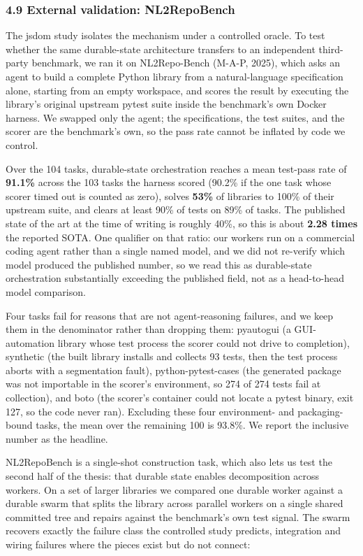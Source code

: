 \documentclass[
  10pt,
]{article}
\begin{document}
\subsubsection{4.9 External validation:
NL2RepoBench}\label{external-validation-nl2repobench}

The jsdom study isolates the mechanism under a controlled oracle. To
test whether the same durable-state architecture transfers to an
independent third-party benchmark, we ran it on NL2Repo-Bench (M-A-P,
2025), which asks an agent to build a complete Python library from a
natural-language specification alone, starting from an empty workspace,
and scores the result by executing the library's original upstream
pytest suite inside the benchmark's own Docker harness. We swapped only
the agent; the specifications, the test suites, and the scorer are the
benchmark's own, so the pass rate cannot be inflated by code we control.

Over the 104 tasks, durable-state orchestration reaches a mean test-pass
rate of \textbf{91.1\%} across the 103 tasks the harness scored (90.2\%
if the one task whose scorer timed out is counted as zero), solves
\textbf{53\%} of libraries to 100\% of their upstream suite, and clears
at least 90\% of tests on 89\% of tasks. The published state of the art
at the time of writing is roughly 40\%, so this is about \textbf{2.28
times} the reported SOTA. One qualifier on that ratio: our workers run
on a commercial coding agent rather than a single named model, and we
did not re-verify which model produced the published number, so we read
this as durable-state orchestration substantially exceeding the
published field, not as a head-to-head model comparison.

Four tasks fail for reasons that are not agent-reasoning failures, and
we keep them in the denominator rather than dropping them: pyautogui (a
GUI-automation library whose test process the scorer could not drive to
completion), synthetic (the built library installs and collects 93
tests, then the test process aborts with a segmentation fault),
python-pytest-cases (the generated package was not importable in the
scorer's environment, so 274 of 274 tests fail at collection), and boto
(the scorer's container could not locate a pytest binary, exit 127, so
the code never ran). Excluding these four environment- and
packaging-bound tasks, the mean over the remaining 100 is 93.8\%. We
report the inclusive number as the headline.

NL2RepoBench is a single-shot construction task, which also lets us test
the second half of the thesis: that durable state enables decomposition
across workers. On a set of larger libraries we compared one durable
worker against a durable swarm that splits the library across parallel
workers on a single shared committed tree and repairs against the
benchmark's own test signal. The swarm recovers exactly the failure
class the controlled study predicts, integration and wiring failures
where the pieces exist but do not connect:
\end{document}
